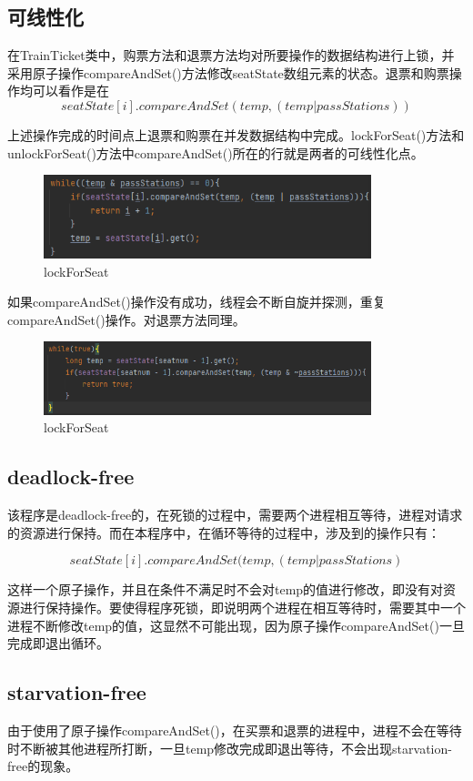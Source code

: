 \documentclass{article}
\begin{document}
\subsection{可线性化}
在TrainTicket类中，购票方法和退票方法均对所要操作的数据结构进行上锁，并采用原子操作compareAndSet()方法修改seatState数组元素的状态。退票和购票操作均可以看作是在
$$
seatState[i].compareAndSet(temp, (temp | passStations))
$$\par 
上述操作完成的时间点上退票和购票在并发数据结构中完成。lockForSeat()方法和unlockForSeat()方法中compareAndSet()所在的行就是两者的可线性化点。
\begin{figure}[H]
    \centering
    \includegraphics[width = 0.85\textwidth]{2.png}
    \caption{lockForSeat}
\end{figure}\par 
如果compareAndSet()操作没有成功，线程会不断自旋并探测，重复compareAndSet()操作。对退票方法同理。
\begin{figure}[H]
    \centering
    \includegraphics[width = 0.85\textwidth]{3.png}
    \caption{lockForSeat}
\end{figure}\par
\subsection{deadlock-free}
该程序是deadlock-free的，在死锁的过程中，需要两个进程相互等待，进程对请求的资源进行保持。而在本程序中，在循环等待的过程中，涉及到的操作只有：\par 
$$
seatState[i].compareAndSet(temp, (temp | passStations)
$$\par 
这样一个原子操作，并且在条件不满足时不会对temp的值进行修改，即没有对资源进行保持操作。要使得程序死锁，即说明两个进程在相互等待时，需要其中一个进程不断修改temp的值，这显然不可能出现，因为原子操作compareAndSet()一旦完成即退出循环。
\subsection{starvation-free}
由于使用了原子操作compareAndSet()，在买票和退票的进程中，进程不会在等待时不断被其他进程所打断，一旦temp修改完成即退出等待，不会出现starvation-free的现象。
\end{document}
